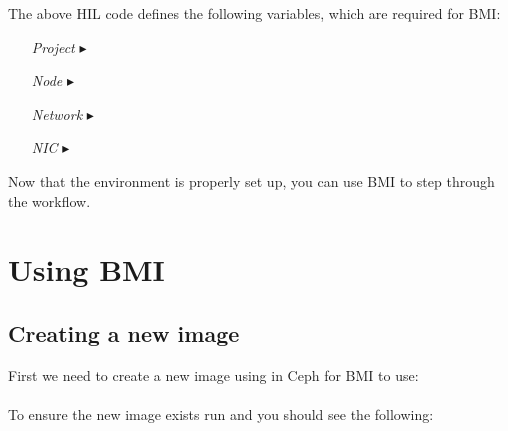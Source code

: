 The above HIL code defines the following variables, which are required for BMI: \\

\begin{itemize}
\item[\emph{Project }$\blacktriangleright$\hspace{-21mm}] \hspace{19mm}  \\
\item[\emph{Node }$\blacktriangleright$\hspace{-21mm}] \hspace{19mm}  \\ %
\item[\emph{Network }$\blacktriangleright$\hspace{-21mm}] \hspace{19mm}  \\
\item[\emph{NIC }$\blacktriangleright$\hspace{-21mm}] \hspace{19mm}  \\
\end{itemize}

Now that the environment is properly set up, you can use BMI to step through the workflow.

\section{Using BMI}

\subsection{Creating a new image}

First we need to create a new image using  in Ceph for BMI to use: \\

 \\

To ensure the new image exists run  and you should see the following: 


